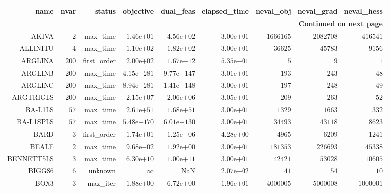 \begin{longtable}{rrrrrrrrr}
\hline
name & nvar & status & objective & dual\_feas & elapsed\_time & neval\_obj & neval\_grad & neval\_hess \\\hline
\endhead
\hline
\multicolumn{9}{r}{{\bfseries Continued on next page}}\\
\hline
\endfoot
\endlastfoot
AKIVA & \(     2\) & max\_time & \( 1.46\)e\(+01\) & \( 4.56\)e\(+02\) & \( 3.00\)e\(+01\) & \(1666165\) & \(2082708\) & \(416541\) \\
ALLINITU & \(     4\) & max\_time & \( 1.10\)e\(+02\) & \( 1.82\)e\(+02\) & \( 3.00\)e\(+01\) & \( 36625\) & \( 45783\) & \(  9156\) \\
ARGLINA & \(   200\) & first\_order & \( 2.00\)e\(+02\) & \( 1.67\)e\(-12\) & \( 5.35\)e\(-01\) & \(     5\) & \(     9\) & \(     1\) \\
ARGLINB & \(   200\) & max\_time & \(4.15\)e\(+281\) & \(9.77\)e\(+147\) & \( 3.01\)e\(+01\) & \(   193\) & \(   243\) & \(    48\) \\
ARGLINC & \(   200\) & max\_time & \(8.94\)e\(+281\) & \(1.41\)e\(+148\) & \( 3.00\)e\(+01\) & \(   197\) & \(   248\) & \(    49\) \\
ARGTRIGLS & \(   200\) & max\_time & \( 2.15\)e\(+07\) & \( 2.06\)e\(+06\) & \( 3.05\)e\(+01\) & \(   209\) & \(   263\) & \(    52\) \\
BA-L1LS & \(    57\) & max\_time & \( 2.61\)e\(+51\) & \( 1.68\)e\(+51\) & \( 3.00\)e\(+01\) & \(  1329\) & \(  1663\) & \(   332\) \\
BA-L1SPLS & \(    57\) & max\_time & \(5.48\)e\(+170\) & \(6.01\)e\(+130\) & \( 3.00\)e\(+01\) & \( 34493\) & \( 43118\) & \(  8623\) \\
BARD & \(     3\) & first\_order & \( 1.74\)e\(+01\) & \( 1.25\)e\(-06\) & \( 4.28\)e\(+00\) & \(  4965\) & \(  6209\) & \(  1241\) \\
BEALE & \(     2\) & max\_time & \( 9.68\)e\(-02\) & \( 1.92\)e\(+00\) & \( 3.00\)e\(+01\) & \(181353\) & \(226693\) & \( 45338\) \\
BENNETT5LS & \(     3\) & max\_time & \( 6.30\)e\(+10\) & \( 1.00\)e\(+11\) & \( 3.00\)e\(+01\) & \( 42421\) & \( 53028\) & \( 10605\) \\
BIGGS6 & \(     6\) & unknown & \(\infty\) &       NaN & \( 2.07\)e\(-02\) & \(    41\) & \(    54\) & \(    10\) \\
BOX3 & \(     3\) & max\_iter & \( 1.88\)e\(+00\) & \( 6.72\)e\(+00\) & \( 1.96\)e\(+01\) & \(4000005\) & \(5000008\) & \(1000001\) \\

\end{longtable}

